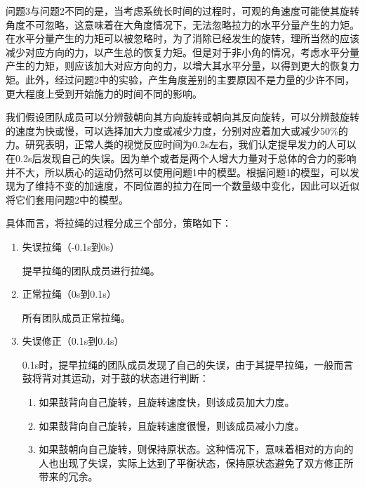 \documentclass[nocover]{cumcmart}%
\begin{document}
问题3与问题2不同的是，当考虑系统长时间的过程时，可观的角速度可能使其旋转角度不可忽略，这意味着在大角度情况下，无法忽略拉力的水平分量产生的力矩。在水平分量产生的力矩可以被忽略时，为了消除已经发生的旋转，理所当然的应该减少对应方向的力，以产生总的恢复力矩。但是对于非小角的情况，考虑水平分量产生的力矩，则应该加大对应方向的力，以增大其水平分量，以得到更大的恢复力矩。此外，经过问题2中的实验，产生角度差别的主要原因不是力量的少许不同，更大程度上受到开始施力的时间不同的影响。


我们假设团队成员可以分辨鼓朝向其方向旋转或朝向其反向旋转，可以分辨鼓旋转的速度为快或慢，可以选择加大力度或减少力度，分别对应着加大或减少50\%的力。研究表明，正常人类的视觉反应时间为0.2s左右\cite{人类反应时间}，我们认定提早发力的人可以在0.2s后发现自己的失误。因为单个或者是两个人增大力量对于总体的合力的影响并不大，所以质心的运动仍然可以使用问题1中的模型。根据问题1的模型，可以发现为了维持不变的加速度，不同位置的拉力在同一个数量级中变化，因此可以近似将它们套用问题2中的模型。

具体而言，将拉绳的过程分成三个部分，策略如下：

\begin{enumerate}
    \item 失误拉绳（-0.1s到0s）
    
    提早拉绳的团队成员进行拉绳。
    \item 正常拉绳（0s到0.1s）
    
    所有团队成员正常拉绳。
    \item 失误修正（0.1s到0.4s）
    
    0.1s时，提早拉绳的团队成员发现了自己的失误，由于其提早拉绳，一般而言鼓将背对其运动，对于鼓的状态进行判断：
    \begin{enumerate}
        \item 如果鼓背向自己旋转，且旋转速度快，则该成员加大力度。
        \item 如果鼓背向自己旋转，且旋转速度很慢，则该成员减小力度。
        \item 如果鼓朝向自己旋转，则保持原状态。这种情况下，意味着相对的方向的人也出现了失误，实际上达到了平衡状态，保持原状态避免了双方修正所带来的冗余。
    \end{enumerate}
\end{enumerate}
\end{document}
